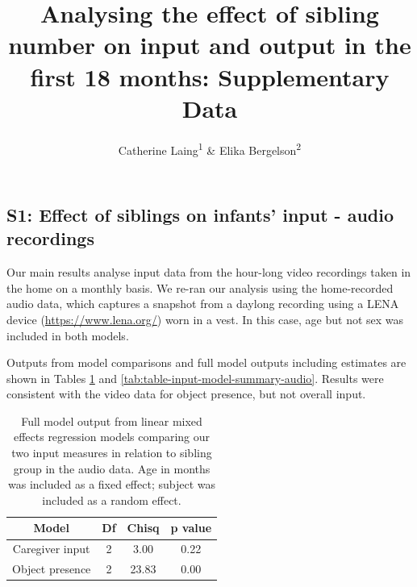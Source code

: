 \documentclass[
  man,floatsintext]{apa6}
\title{Analysing the effect of sibling number on input and output in the first 18 months: Supplementary Data}
\author{Catherine Laing\textsuperscript{1} \& Elika Bergelson\textsuperscript{2}}
\date{}
\affiliation{\vspace{0.5cm}\textsuperscript{1} University of York, York, UK\\\textsuperscript{2} Duke University, Durham, NC, USA}
\begin{document}
\maketitle

\hypertarget{s1-effect-of-siblings-on-infants-input---audio-recordings}{%
\subsection{S1: Effect of siblings on infants' input - audio recordings}\label{s1-effect-of-siblings-on-infants-input---audio-recordings}}

Our main results analyse input data from the hour-long video recordings taken in the home on a monthly basis. We re-ran our analysis using the home-recorded audio data, which captures a snapshot from a daylong recording using a LENA device (\url{https://www.lena.org/}) worn in a vest. In this case, age but not sex was included in both models.

Outputs from model comparisons and full model outputs including estimates are shown in Tables \ref{tab:table-model-comparisons-audio} and \ref{tab:table-input-model-summary-audio}. Results were consistent with the video data for object presence, but not overall input.

\begin{longtable}[t]{cccc}
\caption{\label{tab:table-model-comparisons-audio}Full model output from linear mixed effects regression models comparing our two input measures in relation to sibling group in the audio data. Age in months was included as a fixed effect; subject was included as a random effect.}\\
\toprule
Model & Df & Chisq & p value\\
\midrule
Caregiver input & 2 & 3.00 & 0.22\\
Object presence & 2 & 23.83 & 0.00\\
\bottomrule
\end{longtable}
\end{document}
